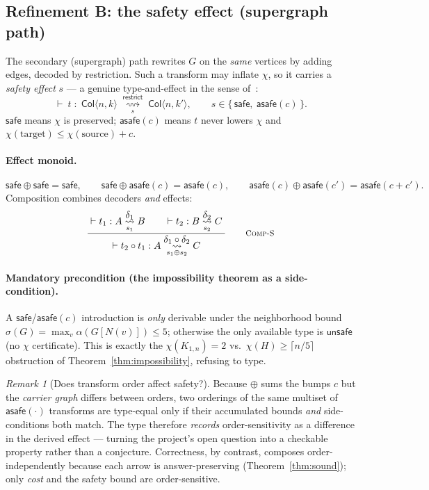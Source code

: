 \documentclass[11pt]{article}
\theoremstyle{definition}
\theoremstyle{remark}
\newtheorem{remark}[theorem]{Remark}
\newcommand{\indep}{\alpha}
\newcommand{\Col}{\mathsf{Col}}
\newcommand{\safe}{\textsf{safe}}
\newcommand{\asafe}[1]{\textsf{asafe}(#1)}
\newcommand{\rn}[1]{\textsc{\footnotesize #1}}
\newcommand{\irule}[2]{\ensuremath{\dfrac{\;#1\;}{\;#2\;}}}
\newcommand{\redtos}[2]{\mathrel{\overset{\textstyle #1}{\underset{#2}{\rightsquigarrow}}}}
\begin{document}
\subsection{Refinement B: the safety effect (supergraph path)}
\label{sec:safety}

The secondary (supergraph) path rewrites $G$ on the \emph{same} vertices by adding edges,
decoded by restriction. Such a transform may inflate $\chi$, so it carries a \emph{safety
effect} $s$ --- a genuine type-and-effect in the sense
of~\cite{BartolettiDeganoFerrariZunino2009}:
\[
  \vdash\ t \;:\; \Col\langle n,k\rangle \;\redtos{\mathsf{restrict}}{s}\; \Col\langle n,k'\rangle,
  \qquad s\in\{\,\safe,\ \asafe{c}\,\}.
\]
$\safe$ means $\chi$ is preserved; $\asafe{c}$ means $t$ never lowers $\chi$ and
$\chi(\text{target})\le\chi(\text{source})+c$.

\paragraph{Effect monoid.}
\[
  \safe\oplus\safe=\safe,\qquad
  \safe\oplus\asafe{c}=\asafe{c},\qquad
  \asafe{c}\oplus\asafe{c'}=\asafe{c+c'}.
\]
Composition combines decoders \emph{and} effects:
\[
  \irule{\vdash t_1 : A \redtos{\delta_1}{s_1} B \qquad \vdash t_2 : B \redtos{\delta_2}{s_2} C}
        {\vdash t_2\circ t_1 : A \redtos{\delta_1\circ\delta_2}{\,s_1\oplus s_2\,} C}
  \qquad\rn{Comp-S}
\]

\paragraph{Mandatory precondition (the impossibility theorem as a side-condition).} A
$\safe$/$\asafe{c}$ introduction is \emph{only} derivable under the neighborhood bound
$\sigma(G)=\max_v\indep(G[N(v)])\le 5$; otherwise the only available type is
$\textsf{unsafe}$ (no $\chi$ certificate). This is exactly the $\chi(K_{1,n})=2$ vs.\
$\chi(H)\ge\lceil n/5\rceil$ obstruction of Theorem~\ref{thm:impossibility}, refusing to
type.

\begin{remark}[Does transform order affect safety?]
Because $\oplus$ sums the bumps $c$ but the \emph{carrier graph} differs between orders,
two orderings of the same multiset of $\asafe{\cdot}$ transforms are type-equal only if
their accumulated bounds \emph{and} side-conditions both match. The type therefore
\emph{records} order-sensitivity as a difference in the derived effect --- turning the
project's open question into a checkable property rather than a conjecture. Correctness,
by contrast, composes order-independently because each arrow is answer-preserving
(Theorem~\ref{thm:sound}); only \emph{cost} and the safety bound are order-sensitive.
\end{remark}
\end{document}
